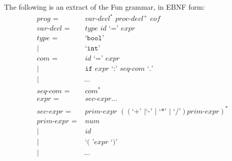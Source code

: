 \documentclass[a4paper, openany]{memoir}
\begin{document}
The following is an extract of the Fun grammar, in EBNF form:
\begin{align*}
    \textit{prog } =& \textit{ var-decl}^* \textit{ proc-decl}^+ \textit{ eof} \\
    \textit{var-decl } =& \textit{ type id } \text{`}\texttt{=}\text{'} \textit{ expr} \\
    \textit{type } =& \text{ `}\texttt{bool}\text{'} \\
    |\hspace{2pt} & \text{ `}\texttt{int}\text{'} \\
    \textit{com } =& \textit{ id } \text{`}\texttt{=}\text{'} \textit{ expr} \\
    |\hspace{2pt} & \texttt{ if } \textit{expr} \text{ `}\texttt{:}\text{'} \textit{ seq-com} \text{ `}\texttt{.}\text{'} \\
    |\hspace{2pt} & \ \dots \\
    \textit{seq-com } =& \textit{ com}^* \\
    \textit{expr } =& \textit{ sec-expr} \dots \\
    \textit{sec-expr } =& \textit{ prim-expr } ((\text{`}\texttt{+}\text{' } | \text{`}\texttt{-}\text{' } | \text{ `}\texttt{*}\text{' } | \text{ `}\texttt{/}\text{'}) \textit{prim-expr})^* \\
    \textit{prim-expr } =& \textit{ num} \\
    |\hspace{2pt} & \textit{ id} \\
    |\hspace{2pt} & \text{ `}\texttt{(}\text{ '} \textit{expr } \text{`}\texttt{)}\text{'} \\
    |\hspace{2pt} & \ \dots
\end{align*}
\end{document}
